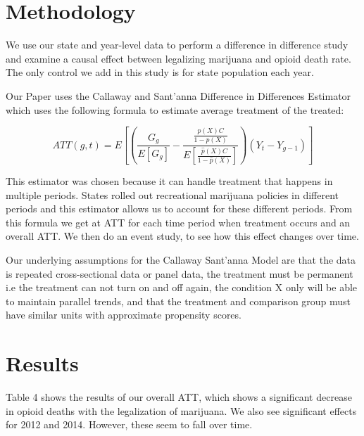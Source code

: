 \documentclass{article}
\begin{document}





\section*{Methodology} %

We use our state and year-level data to perform a difference in difference study and examine a causal effect between legalizing marijuana and opioid death rate. The only control we add in this study is for state population each year. 

Our Paper uses the Callaway and Sant'anna Difference in Differences Estimator which uses the following formula to estimate average treatment of the treated:

$$ATT(g,t)=E[(  \frac{G_g}{ E[G_g]} - \frac{ \frac{ \hat{p} (X)C}{1- \hat{p} (X)}}{E [\frac{\hat{p} (X) C } {1 - \hat{p} (X)}]}) (Y_t - Y_{g-1})]$$

This estimator was chosen because it can handle treatment that happens in multiple periods. States rolled out recreational marijuana policies in different periods and this estimator allows us to account for these different periods. From this formula we get at ATT for each time period when treatment occurs and an overall ATT. We then do an event study, to see how this effect changes over time.

Our underlying assumptions for the Callaway Sant'anna Model are that the data is repeated cross-sectional data or panel data, the treatment must be permanent i.e the treatment can not turn on and off again, the condition X only will be able to maintain parallel trends, and that the treatment and comparison group must have similar units with approximate propensity scores.

\section*{Results}

Table 4 shows the results of our overall ATT, which shows a significant decrease in opioid deaths with the legalization of marijuana. We also see significant effects for 2012 and 2014. However, these seem to fall over time.
\end{document}
